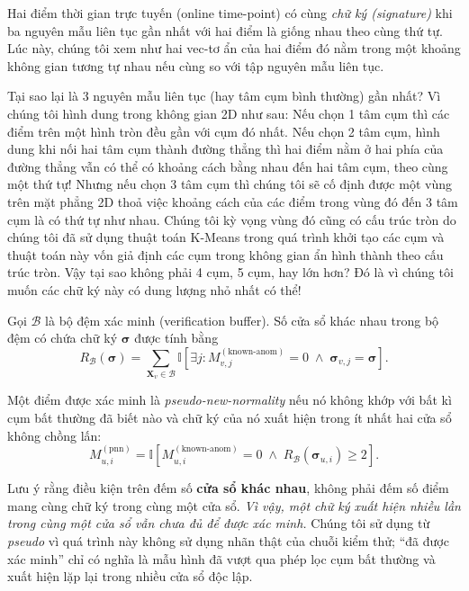 Hai điểm thời gian trực tuyến (online time-point) có cùng \textit{chữ ký (signature)} khi ba nguyên mẫu liên tục gần nhất với hai điểm là giống nhau theo cùng thứ tự. Lúc này, chúng tôi xem như hai vec-tơ ẩn của hai điểm đó nằm trong một khoảng không gian tương tự nhau nếu cùng so với tập nguyên mẫu liên tục.

Tại sao lại là 3 nguyên mẫu liên tục (hay tâm cụm bình thường) gần nhất? Vì chúng tôi hình dung trong không gian 2D như sau: Nếu chọn 1 tâm cụm thì các điểm trên một hình tròn đều gần với cụm đó nhất. Nếu chọn 2 tâm cụm, hình dung khi nối hai tâm cụm thành đường thẳng thì hai điểm nằm ở hai phía của đường thẳng vẫn có thể có khoảng cách bằng nhau đến hai tâm cụm, theo cùng một thứ tự! Nhưng nếu chọn 3 tâm cụm thì chúng tôi sẽ cố định được một vùng trên mặt phẳng 2D thoả việc khoảng cách của các điểm trong vùng đó đến 3 tâm cụm là có thứ tự như nhau. Chúng tôi kỳ vọng vùng đó cũng có cấu trúc tròn do chúng tôi đã sử dụng thuật toán K-Means trong quá trình khởi tạo các cụm và thuật toán này vốn giả định các cụm trong không gian ẩn hình thành theo cấu trúc tròn. Vậy tại sao không phải 4 cụm, 5 cụm, hay lớn hơn? Đó là vì chúng tôi muốn các chữ ký này có dung lượng nhỏ nhất có thể!

Gọi \(\mathcal{B}\) là bộ đệm xác minh (verification buffer). Số cửa sổ khác nhau trong bộ đệm có chứa chữ ký \(\boldsymbol{\sigma}\) được tính bằng
\begin{equation}
R_{\mathcal{B}}(\boldsymbol{\sigma})
=
\sum_{\mathbf{X}_v\in\mathcal{B}}
\mathbb{I}
\left[
\exists j:
M^{(\mathrm{known\text{-}anom})}_{v,j}=0
\;\land\;
\boldsymbol{\sigma}_{v,j}
=
\boldsymbol{\sigma}
\right].
\end{equation}

Một điểm được xác minh là
\textit{pseudo-new-normality} nếu nó không khớp với bất kì cụm bất thường đã biết nào và chữ ký của nó xuất hiện trong ít nhất hai cửa sổ không chồng lấn:
\begin{equation}
M^{(\mathrm{pnn})}_{u,i}
=
\mathbb{I}
\left[
M^{(\mathrm{known\text{-}anom})}_{u,i}=0
\;\land\;
R_{\mathcal{B}}
\left(
\boldsymbol{\sigma}_{u,i}
\right)
\geq 2
\right].
\end{equation}

Lưu ý rằng điều kiện trên đếm số \textbf{cửa sổ khác nhau}, không phải đếm số điểm mang cùng
chữ ký trong cùng một cửa sổ. \textit{Vì vậy, một chữ ký xuất hiện nhiều lần trong cùng một cửa sổ vẫn chưa đủ để được xác minh.} Chúng tôi sử dụng từ
\textit{pseudo} vì quá trình này không sử dụng nhãn thật của chuỗi kiểm thử; ``đã được xác minh'' chỉ có nghĩa là mẫu hình đã vượt qua phép lọc cụm bất
thường và xuất hiện lặp lại trong nhiều cửa sổ độc lập.

